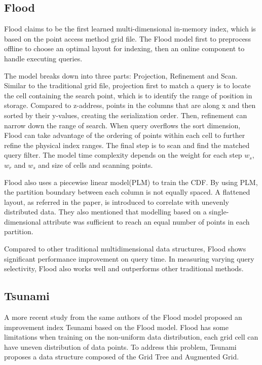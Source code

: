 \subsection{Flood}
Flood \cite{Nathan:2019wc} claims to be the first learned multi-dimensional in-memory index, which is based on the point access method grid file. The Flood model first to preprocess offline to choose an optimal layout for indexing, then an online component to handle executing queries. 

The model breaks down into three parts: Projection, Refinement and Scan. Similar to the traditional grid file, projection first to match a query is to locate the cell containing the search point, which is to identify the range of position in storage. Compared to z-address, points in the columns that are along x and then sorted by their y-values, creating the serialization order. Then, refinement can narrow down the range of search. When query overflows the sort dimension, Flood can take advantage of the ordering of points within each cell to further refine the physical index ranges. The final step is to scan and find the matched query filter. The model time complexity depends on the weight for each step $w_s$, $w_r$ and $w_s$ and size of cells and scanning points. 

Flood also uses a piecewise linear model(PLM) to train the CDF. By using PLM, the partition boundary between each column is not equally spaced. A flattened layout, as referred in the paper, is introduced to correlate with unevenly distributed data. They also mentioned that modelling based on a single-dimensional attribute was sufficient to reach an equal number of points in each partition. 

Compared to other traditional multidimensional data structures, Flood shows significant performance improvement on query time. In measuring varying query selectivity, Flood also works well and outperforms other traditional methods. 


\subsection{Tsunami}
A more recent study from the same authors of the Flood model proposed an improvement index Tsunami \cite{Ding:2020we} based on the Flood model. Flood has some limitations when training on the non-uniform data distribution, each grid cell can have uneven distribution of data points. To address this problem, Tsunami proposes a data structure composed of the Grid Tree and Augmented Grid. 

